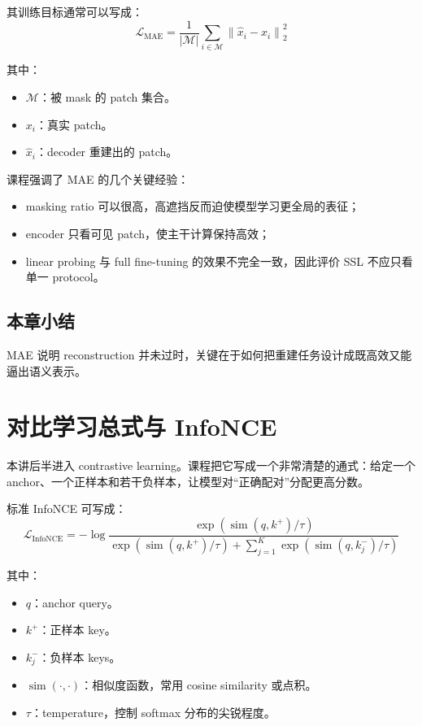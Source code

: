 \documentclass[a4paper]{article}
\begin{document}
其训练目标通常可以写成：
\[
\mathcal{L}_{\mathrm{MAE}}
=
\frac{1}{|\mathcal{M}|}
\sum_{i \in \mathcal{M}}
\left\lVert \hat{x}_i - x_i \right\rVert_2^2
\]

其中：
\begin{itemize}
\item $\mathcal{M}$：被 mask 的 patch 集合。
\item $x_i$：真实 patch。
\item $\hat{x}_i$：decoder 重建出的 patch。
\end{itemize}

课程强调了 MAE 的几个关键经验：
\begin{itemize}
\item masking ratio 可以很高，高遮挡反而迫使模型学习更全局的表征；
\item encoder 只看可见 patch，使主干计算保持高效；
\item linear probing 与 full fine-tuning 的效果不完全一致，因此评价 SSL 不应只看单一 protocol。
\end{itemize}

\subsection{本章小结}
MAE 说明 reconstruction 并未过时，关键在于如何把重建任务设计成既高效又能逼出语义表示。

\section{对比学习总式与 InfoNCE}
本讲后半进入 contrastive learning。课程把它写成一个非常清楚的通式：给定一个 anchor、一个正样本和若干负样本，让模型对“正确配对”分配更高分数。

标准 InfoNCE 可写成：
\[
\mathcal{L}_{\mathrm{InfoNCE}}
=
-\log
\frac{\exp(\operatorname{sim}(q, k^+) / \tau)}
{\exp(\operatorname{sim}(q, k^+) / \tau)
+
\sum_{j=1}^{K}\exp(\operatorname{sim}(q, k_j^-) / \tau)}
\]

其中：
\begin{itemize}
\item $q$：anchor query。
\item $k^+$：正样本 key。
\item $k_j^-$：负样本 keys。
\item $\operatorname{sim}(\cdot, \cdot)$：相似度函数，常用 cosine similarity 或点积。
\item $\tau$：temperature，控制 softmax 分布的尖锐程度。
\end{itemize}
\end{document}
